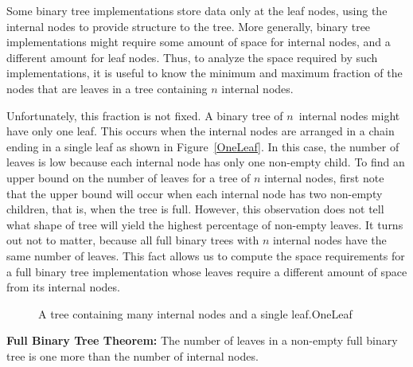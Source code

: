 Some
binary tree
implementations store data only at the leaf nodes,
using the internal nodes to provide structure to the tree.
More generally, binary tree implementations might require some amount
of space for internal nodes, and a different amount for leaf nodes.
Thus, to analyze the space required by such implementations, it is
useful to know the minimum and maximum fraction of the nodes that are
leaves in a tree containing \(n\) internal nodes.

Unfortunately, this fraction is not fixed.
A binary tree of \(n\)~internal nodes might have only one leaf.
This occurs when the internal nodes are arranged in a chain ending
in a single leaf as shown in Figure~\ref{OneLeaf}.
In this case, the number of leaves is low because each
internal node has only one non-empty child.
To find an upper bound on the number of leaves for a tree of \(n\)
internal nodes, first note that the upper bound will occur when each
internal node has two non-empty children, that is, when the tree is
full.
However, this observation does not tell what shape of tree will yield
the highest percentage of non-empty leaves.
It turns out not to matter, because all full binary trees with
\(n\) internal nodes have the same number of leaves.
This fact allows us to compute the space requirements for a full
binary tree implementation whose leaves require a different amount of
space from its internal nodes.

\begin{figure}
\vspace{-\bigskipamount}\vspace{-\bigskipamount}

{A tree containing many internal nodes and a single leaf.}{OneLeaf}
\end{figure}

\begin{theorem}
{\bf Full Binary Tree Theorem:}
The number of leaves in a non-empty full binary tree is one
more than the number of internal nodes.
\end{theorem}

